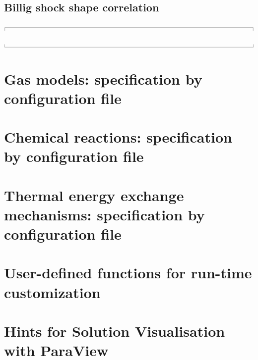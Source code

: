\documentclass[12pt,a4paper,twoside]{article}
\newcommand{\topbar}{\ensuremath{
    \rule{0.1mm}{2.0mm} \rule[2.0mm]{159.5mm}{0.1mm} \rule{0.1mm}{2.0mm}
}}
\newcommand{\bottombar}{\ensuremath{
    \rule{0.1mm}{2.0mm} \rule{159.5mm}{0.1mm} \rule{0.1mm}{2.0mm}
}}
\begin{document}
\subsection{Billig shock shape correlation}
\label{billig-correlation}
\topbar

\bottombar

\cleardoublepage
\section{Gas models: specification by configuration file}
\label{app:gas-models}


\cleardoublepage
\section{Chemical reactions: specification by configuration file}
\label{app:chem}


\cleardoublepage
\section{Thermal energy exchange mechanisms: specification by configuration file}
\label{app:therm-exchange}


\cleardoublepage
\section{User-defined functions for run-time customization}
\label{udf-sec}


\cleardoublepage
\section{Hints for Solution Visualisation with ParaView}
\label{app:paraview}


\cleardoublepage
{} %
\printindex
\end{document}
